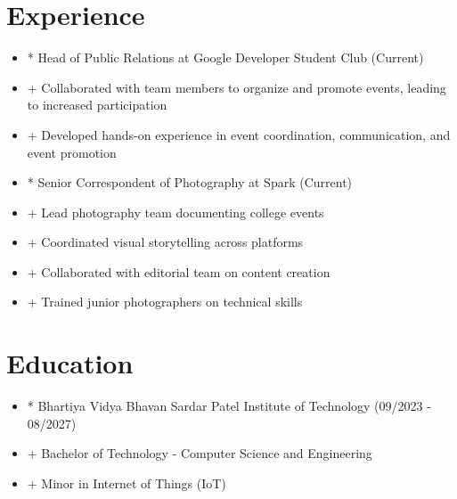 \documentclass[10pt]{article}
\begin{document}
\section*{Experience}
\begin{itemize}[leftmargin=*]

  \item * Head of Public Relations at Google Developer Student Club (Current)

  \item + Collaborated with team members to organize and promote events, leading to increased participation

  \item + Developed hands-on experience in event coordination, communication, and event promotion

  \item * Senior Correspondent of Photography at Spark (Current)

  \item + Lead photography team documenting college events

  \item + Coordinated visual storytelling across platforms

  \item + Collaborated with editorial team on content creation

  \item + Trained junior photographers on technical skills

\end{itemize}



\section*{Education}
\begin{itemize}[leftmargin=*]

  \item * Bhartiya Vidya Bhavan Sardar Patel Institute of Technology (09/2023 - 08/2027)

  \item + Bachelor of Technology - Computer Science and Engineering

  \item + Minor in Internet of Things (IoT)

\end{itemize}
\end{document}
